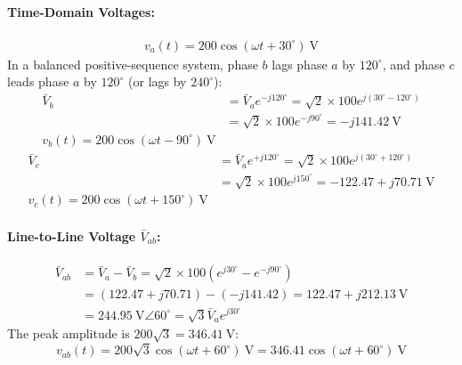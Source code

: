 \paragraph{Time-Domain Voltages:}
\begin{align}
    \boxed{v_a(t) = 200 \cos(\omega t + 30^\circ)\ \text{V}}
\end{align}
In a balanced positive-sequence system, phase $b$ lags phase $a$ by $120^\circ$, and phase $c$ leads phase $a$ by $120^\circ$ (or lags by $240^\circ$):
\begin{align}
    \bar{V}_b &= \bar{V}_a e^{-j 120^\circ} = \sqrt{2} \times 100 e^{j (30^\circ - 120^\circ)} \nonumber\\
              &= \sqrt{2} \times 100 e^{-j 90^\circ} = -j 141.42\ \text{V} \\
    \boxed{v_b(t) = 200 \cos(\omega t - 90^\circ)\ \text{V}}
\end{align}
\begin{align}
    \bar{V}_c &= \bar{V}_a e^{+j 120^\circ} = \sqrt{2} \times 100 e^{j (30^\circ + 120^\circ)} \nonumber\\
              &= \sqrt{2} \times 100 e^{j 150^\circ} = -122.47 + j 70.71\ \text{V} \\
    \boxed{v_c(t) = 200 \cos(\omega t + 150^\circ)\ \text{V}}
\end{align}

\paragraph{Line-to-Line Voltage $\bar{V}_{ab}$:}
\begin{align}
    \bar{V}_{ab} &= \bar{V}_a - \bar{V}_b = \sqrt{2} \times 100 \left( e^{j 30^\circ} - e^{-j 90^\circ} \right) \nonumber\\
                 &= (122.47 + j 70.71) - (-j 141.42) = 122.47 + j 212.13\ \text{V} \nonumber\\
                 &= 244.95\ \text{V} \angle 60^\circ = \sqrt{3} \bar{V}_a e^{j 30^\circ}
\end{align}
The peak amplitude is $200 \sqrt{3} = 346.41\ \text{V}$:
\begin{equation}
    \boxed{v_{ab}(t) = 200\sqrt{3} \cos(\omega t + 60^\circ)\ \text{V} = 346.41 \cos(\omega t + 60^\circ)\ \text{V}}
\end{equation}

